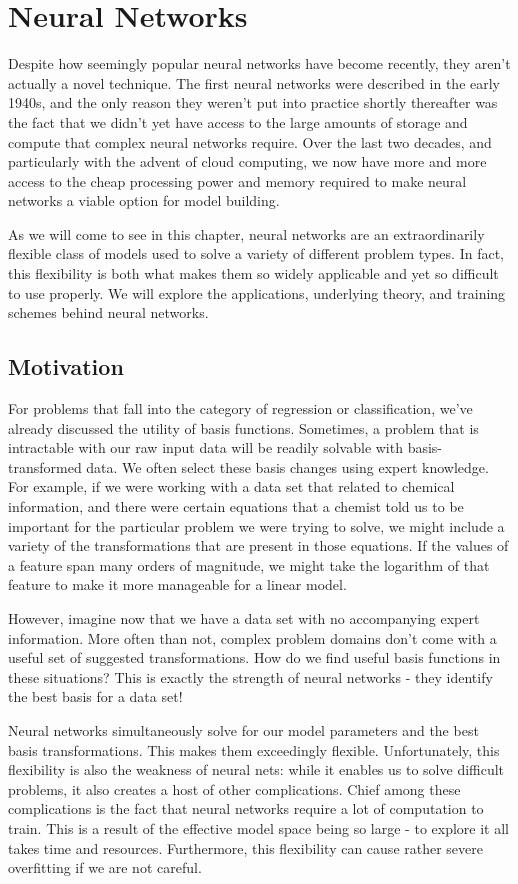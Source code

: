 \chapter{Neural Networks}
Despite how seemingly popular neural networks have become recently, they aren't actually a novel technique. The first neural networks were described in the early 1940s, and the only reason they weren't put into practice shortly thereafter was the fact that we didn't yet have access to the large amounts of storage and compute that complex neural networks require. Over the last two decades, and particularly with the advent of cloud computing, we now have more and more access to the cheap processing power and memory required to make neural networks a viable option for model building.

As we will come to see in this chapter, neural networks are an extraordinarily flexible class of models used to solve a variety of different problem types. In fact, this flexibility is both what makes them so widely applicable and yet so difficult to use properly. We will explore the applications, underlying theory, and training schemes behind neural networks.

\section{Motivation}
For problems that fall into the category of regression or classification, we've already discussed the utility of basis functions. Sometimes, a problem that is intractable with our raw input data will be readily solvable with basis-transformed data. We often select these basis changes using expert knowledge. For example, if we were working with a data set that related to chemical information, and there were certain equations that a chemist told us to be important for the particular problem we were trying to solve, we might include a variety of the transformations that are present in those equations. If the values of a feature span many orders of magnitude, we might take the logarithm of that feature to make it more manageable for a linear model.

However, imagine now that we have a data set with no accompanying expert information. More often than not, complex problem domains don't come with a useful set of suggested transformations. How do we find useful basis functions in these situations? This is exactly the strength of neural networks - they identify the best basis for a data set!

Neural networks simultaneously solve for our model parameters and the best basis transformations. This makes them exceedingly flexible. Unfortunately, this flexibility is also the weakness of neural nets: while it enables us to solve difficult problems, it also creates a host of other complications. Chief among these complications is the fact that neural networks require a lot of computation to train. This is a result of the effective model space being so large - to explore it all takes time and resources. Furthermore, this flexibility can cause rather severe overfitting if we are not careful.

